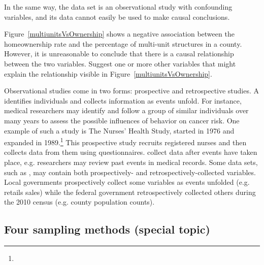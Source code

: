 In the same way, the  data set is an observational study with confounding variables, and its data cannot easily be used to make causal conclusions.

\begin{exercisewrap}
\begin{nexercise}
Figure~\ref{multiunitsVsOwnership} shows a negative association between the homeownership rate and the percentage of multi-unit structures in a county. However, it is unreasonable to conclude that there is a causal relationship between the two variables. Suggest one or more other variables that might explain the relationship visible in Figure~\ref{multiunitsVsOwnership}.\footnotemark
\end{nexercise}
\end{exercisewrap}

Observational studies come in two forms: prospective and retrospective studies. A  identifies individuals and collects information as events unfold. For instance, medical researchers may identify and follow a group of similar individuals over many years to assess the possible influences of behavior on cancer risk. One example of such a study is The Nurses' Health Study, started in 1976 and expanded in 1989.\footnote{} This prospective study recruits registered nurses and then collects data from them using questionnaires.  collect data after events have taken place, e.g. researchers may review past events in medical records. Some data sets, such as , may contain both prospectively- and retrospectively-collected variables. Local governments prospectively collect some variables as events unfolded (e.g. retails sales) while the federal government retrospectively collected others during the 2010 census (e.g. county population counts).

\subsection{Four sampling methods (special topic)}
\label{fourSamplingMethods}
\label{threeSamplingMethods}


